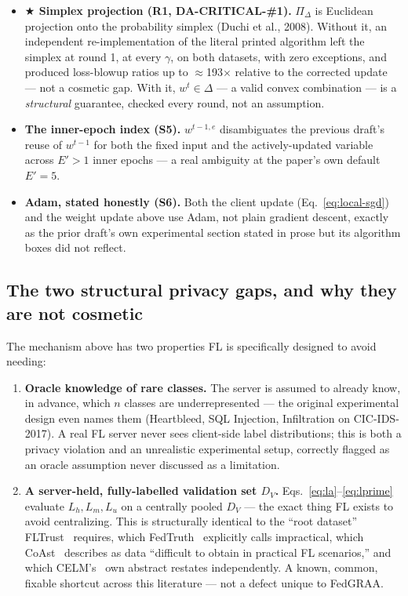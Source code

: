 \documentclass{llncs}
\begin{document}
\begin{itemize}
\item \textbf{$\bigstar$ Simplex projection (R1, DA-CRITICAL-\#1).} $\Pi_\Delta$ is Euclidean projection onto the probability simplex (Duchi et al., 2008). Without it, an independent re-implementation of the literal printed algorithm left the simplex at round 1, at every $\gamma$, on both datasets, with zero exceptions, and produced loss-blowup ratios up to $\approx$193$\times$ relative to the corrected update --- not a cosmetic gap. With it, $w^t \in \Delta$ --- a valid convex combination --- is a \emph{structural} guarantee, checked every round, not an assumption.
\item \textbf{The inner-epoch index (S5).} $w^{t-1,e}$ disambiguates the previous draft's reuse of $w^{t-1}$ for both the fixed input and the actively-updated variable across $E'>1$ inner epochs --- a real ambiguity at the paper's own default $E'=5$.
\item \textbf{Adam, stated honestly (S6).} Both the client update (Eq.~\eqref{eq:local-sgd}) and the weight update above use Adam, not plain gradient descent, exactly as the prior draft's own experimental section stated in prose but its algorithm boxes did not reflect.
\end{itemize}

\subsection{The two structural privacy gaps, and why they are not cosmetic}

The mechanism above has two properties FL is specifically designed to avoid needing:

\begin{enumerate}
\item \textbf{Oracle knowledge of rare classes.} The server is assumed to already know, in advance, which $n$ classes are underrepresented --- the original experimental design even names them (Heartbleed, SQL Injection, Infiltration on CIC-IDS-2017). A real FL server never sees client-side label distributions; this is both a privacy violation and an unrealistic experimental setup, correctly flagged as an oracle assumption never discussed as a limitation.
\item \textbf{A server-held, fully-labelled validation set $D_V$.} Eqs.~\eqref{eq:la}--\eqref{eq:lprime} evaluate $L_h, L_m, L_u$ on a centrally pooled $D_V$ --- the exact thing FL exists to avoid centralizing. This is structurally identical to the ``root dataset'' FLTrust~\cite{FLTrust} requires, which FedTruth~\cite{FedTruth} explicitly calls impractical, which CoAst~\cite{CoAst} describes as data ``difficult to obtain in practical FL scenarios,'' and which CELM's~\cite{CELM} own abstract restates independently. A known, common, fixable shortcut across this literature --- not a defect unique to FedGRAA.
\end{enumerate}
\end{document}
